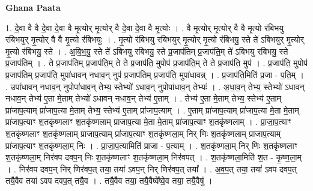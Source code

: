\documentclass[17pt]{extarticle}
\begin{document}
\textbf{Ghana Paata } \newline

1. दे॒वा वै वै दे॒वा दे॒वा वै मृ॒त्योर् मृ॒त्योर् वै दे॒वा दे॒वा वै मृ॒त्योः । . वै मृ॒त्योर् मृ॒त्योर् वै वै मृ॒त्यो र॑बिभयु रबिभयुर् मृ॒त्योर् वै वै मृ॒त्यो र॑बिभयुः । . मृ॒त्यो र॑बिभयु रबिभयुर् मृ॒त्योर् मृ॒त्यो र॑बिभयु॒ स्ते ते॑ ऽबिभयुर् मृ॒त्योर् मृ॒त्यो र॑बिभयु॒ स्ते । . अ॒बि॒भ॒यु॒ स्ते ते॑ ऽबिभयु रबिभयु॒ स्ते प्र॒जाप॑तिम् प्र॒जाप॑ति॒म् ते॑ ऽबिभयु रबिभयु॒ स्ते प्र॒जाप॑तिम् । . ते प्र॒जाप॑तिम् प्र॒जाप॑ति॒म् ते ते प्र॒जाप॑ति॒ मुपोप॑ प्र॒जाप॑ति॒म् ते ते प्र॒जाप॑ति॒ मुप॑ । . प्र॒जाप॑ति॒ मुपोप॑ प्र॒जाप॑तिम् प्र॒जाप॑ति॒ मुपा॑धावन् नधाव॒न् नुप॑ प्र॒जाप॑तिम् प्र॒जाप॑ति॒ मुपा॑धावन्न् । . प्र॒जाप॑ति॒मिति॑ प्र॒जा - प॒ति॒म् । . उपा॑धावन् नधाव॒न् नुपोपा॑धाव॒न् तेभ्य॒ स्तेभ्यो॑ ऽधाव॒न् नुपोपा॑धाव॒न् तेभ्यः॑ । . अ॒धा॒व॒न् तेभ्य॒ स्तेभ्यो॑ ऽधावन् नधाव॒न् तेभ्य॑ ए॒ता मे॒ताम् तेभ्यो॑ ऽधावन् नधाव॒न् तेभ्य॑ ए॒ताम् । . तेभ्य॑ ए॒ता मे॒ताम् तेभ्य॒ स्तेभ्य॑ ए॒ताम् प्रा॑जाप॒त्याम् प्रा॑जाप॒त्या मे॒ताम् तेभ्य॒ स्तेभ्य॑ ए॒ताम् प्रा॑जाप॒त्याम् । . ए॒ताम् प्रा॑जाप॒त्याम् प्रा॑जाप॒त्या मे॒ता मे॒ताम् प्रा॑जाप॒त्याꣳ श॒तकृ॑ष्णलाꣳ श॒तकृ॑ष्णलाम् प्राजाप॒त्या मे॒ता मे॒ताम् प्रा॑जाप॒त्याꣳ श॒तकृ॑ष्णलाम् । . प्रा॒जा॒प॒त्याꣳ श॒तकृ॑ष्णलाꣳ श॒तकृ॑ष्णलाम् प्राजाप॒त्याम् प्रा॑जाप॒त्याꣳ श॒तकृ॑ष्णला॒म् निर् णिः श॒तकृ॑ष्णलाम् प्राजाप॒त्याम् प्रा॑जाप॒त्याꣳ श॒तकृ॑ष्णला॒म् निः । . प्रा॒जा॒प॒त्यामिति॑ प्राजा - प॒त्याम् । . श॒तकृ॑ष्णला॒म् निर् णिः श॒तकृ॑ष्णलाꣳ श॒तकृ॑ष्णला॒म् निर॑वप दवप॒न् निः श॒तकृ॑ष्णलाꣳ श॒तकृ॑ष्णला॒म् निर॑वपत् । . श॒तकृ॑ष्णला॒मिति॑ श॒त - कृ॒ष्ण॒ला॒म् । . निर॑वप दवप॒न् निर् णिर॑वप॒त् तया॒ तया॑ ऽवप॒न् निर् णिर॑वप॒त् तया᳚ । . अ॒व॒प॒त् तया॒ तया॑ ऽवप दवप॒त् तयै॒वैव तया॑ ऽवप दवप॒त् तयै॒व । . तयै॒वैव तया॒ तयै॒वैष्वे᳚ष्वे॒व तया॒ तयै॒वैषु॑ । \newline
\end{document}
